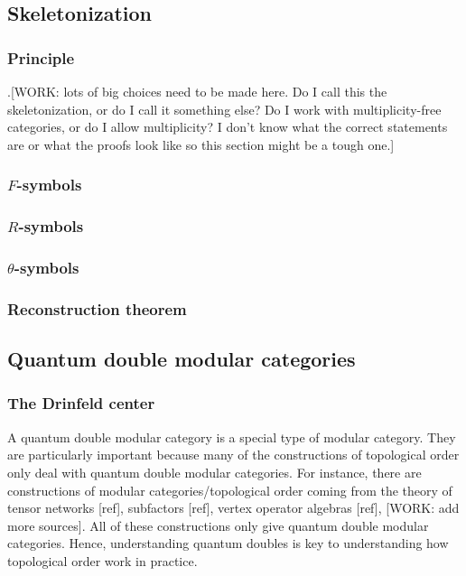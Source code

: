 \subsection{Skeletonization}

\subsubsection{Principle}

.[WORK: lots of big choices need to be made here. Do I call this the skeletonization, or do I call it something else? Do I work with multiplicity-free categories, or do I allow multiplicity? I don't know what the correct statements are or what the proofs look like so this section might be a tough one.]

\subsubsection{$F$-symbols}

\subsubsection{$R$-symbols}

\subsubsection{$\theta$-symbols}

\subsubsection{Reconstruction theorem}



\subsection{Quantum double modular categories}

\subsubsection{The Drinfeld center}

A quantum double modular category is a special type of modular category. They are particularly important because many of the constructions of topological order only deal with quantum double modular categories. For instance, there are constructions of modular categories/topological order coming from the theory of tensor networks [ref], subfactors [ref], vertex operator algebras [ref], [WORK: add more sources]. All of these constructions only give quantum double modular categories. Hence, understanding quantum doubles is key to understanding how topological order work in practice.

